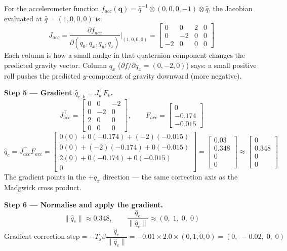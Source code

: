 \documentclass[12pt, a4paper]{article}
\begin{document}
\begin{notebox}
  For the accelerometer function
  $f_{acc}(\mathbf{q}) = \hat{q}^{-1}\otimes(0,0,0,-1)\otimes\hat{q}$,
  the Jacobian evaluated at $\hat{q} = (1,0,0,0)$ is:
  \[
    J_{acc}
    = \frac{\partial f_{acc}}{\partial (q_0,q_x,q_y,q_z)}
      \bigg|_{(1,0,0,0)}
    = \begin{bmatrix}
        0  & 0  &  2 & 0 \\
        0  & -2 &  0 & 0 \\
        -2 & 0  &  0 & 0
      \end{bmatrix}
  \]
  Each column is how a small nudge in that quaternion component changes
  the predicted gravity vector.
  Column $q_x$ ($\partial f/\partial q_x = (0,-2,0)$) says: a small
  positive roll pushes the predicted $y$-component of gravity downward
  (more negative).

  \medskip
  \textbf{Step 5 --- Gradient $\hat{q}_{e,k} = J_k^\top F_k$.}
  \[
    J_{acc}^\top =
    \begin{bmatrix}
       0 &  0 & -2 \\
       0 & -2 &  0 \\
       2 &  0 &  0 \\
       0 &  0 &  0
    \end{bmatrix}, \qquad
    F_{acc} = \begin{bmatrix}0\\-0.174\\-0.015\end{bmatrix}
  \]
  \[
    \hat{q}_{e} = J_{acc}^\top F_{acc}
    = \begin{bmatrix}
        0(0)+0(-0.174)+(-2)(-0.015) \\
        0(0)+(-2)(-0.174)+0(-0.015) \\
        2(0)+0(-0.174)+0(-0.015) \\
        0
      \end{bmatrix}
    = \begin{bmatrix}0.03\\0.348\\0\\0\end{bmatrix}
    \approx
    \begin{bmatrix}0\\0.348\\0\\0\end{bmatrix}
  \]
  The gradient points in the $+q_x$ direction --- the same correction
  axis as the Madgwick cross product.

  \medskip
  \textbf{Step 6 --- Normalise and apply the gradient.}
  \[
    \|\hat{q}_e\| \approx 0.348, \qquad
    \frac{\hat{q}_e}{\|\hat{q}_e\|} \approx (0,\;1,\;0,\;0)
  \]
  \[
    \text{Gradient correction step}
    = -T_s \beta \frac{\hat{q}_e}{\|\hat{q}_e\|}
    = -0.01 \times 2.0 \times (0,1,0,0)
    = (0,\;-0.02,\;0,\;0)
  \]


\end{notebox}
\end{document}
